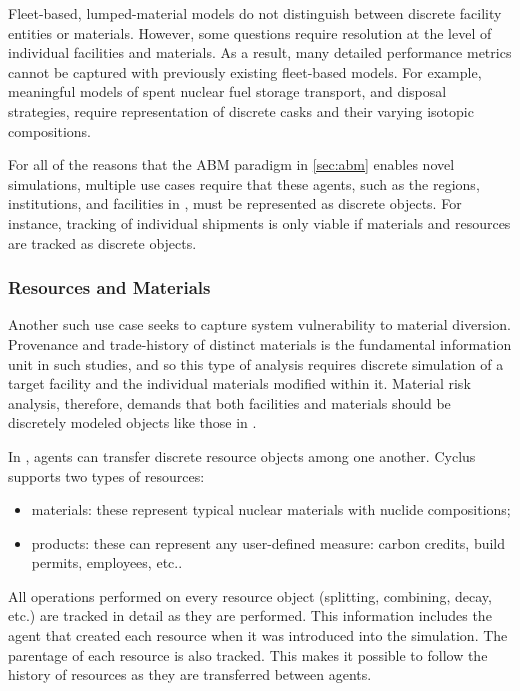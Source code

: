 Fleet-based, lumped-material models do not distinguish between discrete facility
entities or materials. However, some questions require resolution at the level
of individual facilities and materials. As a result, many detailed performance
metrics cannot be captured with previously existing fleet-based models. For 
example, meaningful models of spent nuclear fuel storage transport, and
disposal strategies, require representation of discrete casks and their varying
isotopic compositions.

For all
of the reasons that the \gls{ABM} paradigm in \ref{sec:abm} enables novel
simulations, multiple use cases require that these agents, such as the regions,
institutions, and facilities in \Cyclus, must be represented as discrete
objects. For instance, tracking of individual shipments is only viable if materials and
resources are tracked as discrete objects.

\subsubsection{Resources and Materials}
\label{sec:mats}

Another such use case seeks to capture system vulnerability to
material diversion. Provenance and trade-history of distinct materials is the fundamental
information unit in such studies, and so this type of analysis requires
 discrete simulation of a
target facility and the individual materials modified within it.
Material risk analysis, therefore, demands that both facilities and materials
should be discretely modeled objects like those in \Cyclus.

In \Cyclus, agents can transfer discrete resource objects among one another.
Cyclus supports two types of resources:

\begin{itemize}

  \item materials: these represent typical nuclear materials with
      nuclide compositions;

  \item products: these can represent any user-defined measure: carbon
      credits, build permits, employees, etc..

\end{itemize}

All operations performed on every resource object (splitting, combining,
decay, etc.) are tracked in detail as they are performed.  This information
includes the agent that created each resource when it was introduced into the
simulation.  The parentage of each resource is also tracked. This makes it
possible to follow the history of resources as they are transferred between
agents.

